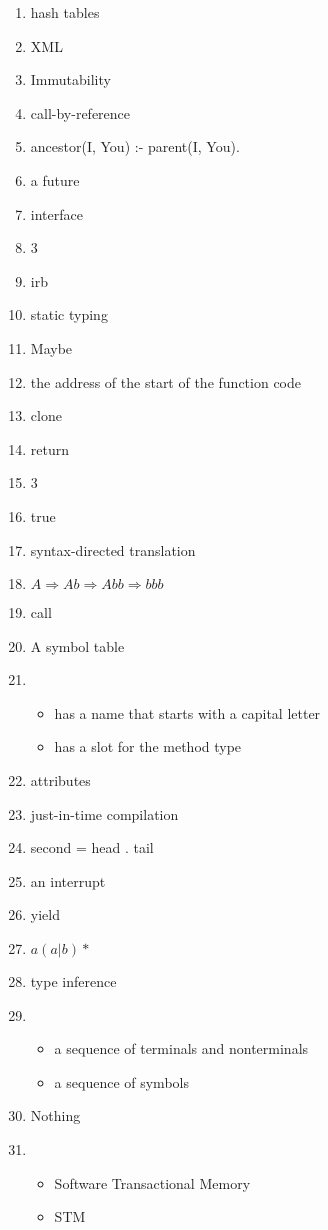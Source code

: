 \documentclass{exam}
\begin{document}
\begin{enumerate}
\begin{itemize}
\end{itemize}
\item hash tables
\item XML
\item Immutability
\item call-by-reference
\item ancestor(I, You) :- parent(I, You).
\item a future
\item interface
\item 3
\item irb
\item static typing
\item Maybe
\item the address of the start of the function code
\item clone
\item return
\item 3
\item true
\item syntax-directed translation
\item $A \Rightarrow Ab \Rightarrow Abb \Rightarrow bbb$
\item call
\item A symbol table
\item \begin{itemize}
\item has a name that starts with a capital letter
\item has a slot for the method type
\end{itemize}
\item attributes
\item just-in-time compilation
\item second = head . tail
\item an interrupt
\item yield
\item $a (a|b)*$
\item type inference
\item \begin{itemize}
\item a sequence of terminals and nonterminals
\item a sequence of symbols
\end{itemize}
\item Nothing
\item \begin{itemize}
\item Software Transactional Memory
\item STM

\end{itemize}
\end{enumerate}
\end{document}
